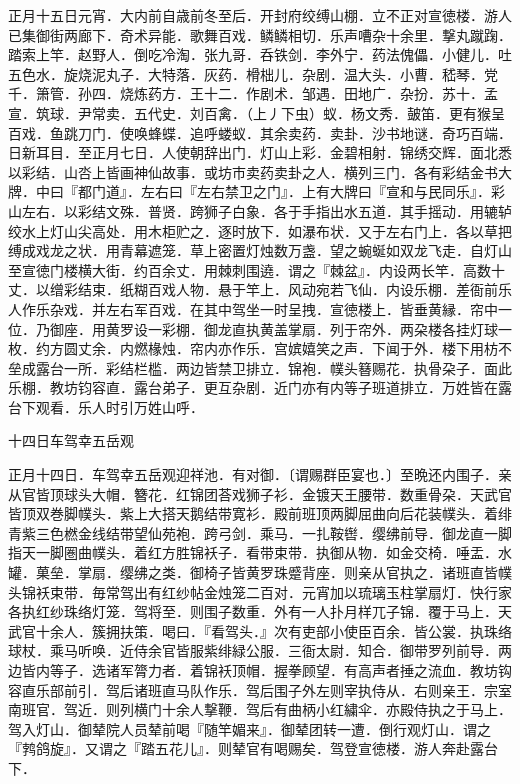 \documentclass[]{article}
\begin{document}
正月十五日元宵．大内前自歳前冬至后．开封府绞缚山棚．立不正对宣徳楼．游人已集御街两廊下．奇术异能．歌舞百戏．鳞鳞相切．乐声嘈杂十余里．撃丸蹴踘．踏索上竿．赵野人．倒吃冷淘．张九哥．呑铁剑．李外宁．药法傀儡．小健儿．吐五色水．旋烧泥丸子．大特落．灰药．榾柮儿．杂剧．温大头．小曹．嵇琴．党千．箫管．孙四．烧炼药方．王十二．作剧术．邹遇．田地广．杂扮．苏十．孟宣．筑球．尹常卖．五代史．刘百禽．（上丿下虫）蚁．杨文秀．皷笛．更有猴呈百戏．鱼跳刀门．使唤蜂蝶．追呼蝼蚁．其余卖药．卖卦．沙书地谜．奇巧百端．日新耳目．至正月七日．人使朝辞出门．灯山上彩．金碧相射．锦绣交辉．面北悉以彩结．山呇上皆画神仙故事．或坊市卖药卖卦之人．横列三门．各有彩结金书大牌．中曰『都门道』．左右曰『左右禁卫之门』．上有大牌曰『宣和与民同乐』．彩山左右．以彩结文殊．普贤．跨狮子白象．各于手指出水五道．其手摇动．用辘轳绞水上灯山尖高处．用木柜贮之．逐时放下．如瀑布状．又于左右门上．各以草把缚成戏龙之状．用青幕遮笼．草上密置灯烛数万盏．望之蜿蜒如双龙飞走．自灯山至宣徳门楼横大街．约百余丈．用棘刺围遶．谓之『棘盆』．内设两长竿．高数十丈．以缯彩结束．纸糊百戏人物．悬于竿上．风动宛若飞仙．内设乐棚．差衙前乐人作乐杂戏．并左右军百戏．在其中驾坐一时呈拽．宣徳楼上．皆垂黄縁．帘中一位．乃御座．用黄罗设一彩棚．御龙直执黄盖掌扇．列于帘外．两朶楼各挂灯球一枚．约方圆丈余．内燃椽烛．帘内亦作乐．宫嫔嬉笑之声．下闻于外．楼下用枋不垒成露台一所．彩结栏槛．两边皆禁卫排立．锦袍．幞头簮赐花．执骨朶子．面此乐棚．教坊钧容直．露台弟子．更互杂剧．近门亦有内等子班道排立．万姓皆在露台下观看．乐人时引万姓山呼．

十四日车驾幸五岳观

正月十四日．车驾幸五岳观迎祥池．有对御．〔谓赐群臣宴也．〕至晩还内围子．亲从官皆顶球头大帽．簪花．红锦团荅戏狮子衫．金镀天王腰带．数重骨朶．天武官皆顶双巻脚幞头．紫上大搭天鹅结带寛衫．殿前班顶两脚屈曲向后花装幞头．着绯青紫三色橪金线结带望仙苑袍．跨弓剑．乘马．一扎鞍辔．缨绋前导．御龙直一脚指天一脚圏曲幞头．着红方胜锦袄子．看带束带．执御从物．如金交椅．唾盂．水罐．菓垒．掌扇．缨绋之类．御椅子皆黄罗珠蹙背座．则亲从官执之．诸班直皆幞头锦袄束带．毎常驾出有红纱帖金烛笼二百对．元宵加以琉璃玉柱掌扇灯．快行家各执红纱珠络灯笼．驾将至．则围子数重．外有一人扑月样兀子锦．覆于马上．天武官十余人．簇拥扶策．喝曰．『看驾头．』次有吏部小使臣百余．皆公裳．执珠络球杖．乘马听唤．近侍余官皆服紫绯緑公服．三衙太尉．知合．御带罗列前导．两边皆内等子．选诸军膂力者．着锦袄顶帽．握拳顾望．有高声者捶之流血．教坊钩容直乐部前引．驾后诸班直马队作乐．驾后围子外左则宰执侍从．右则亲王．宗室南班官．驾近．则列横门十余人撃鞭．驾后有曲柄小红繍伞．亦殿侍执之于马上．驾入灯山．御辇院人员辇前喝『随竿媚来』．御辇团转一遭．倒行观灯山．谓之『鹁鸽旋』．又谓之『踏五花儿』．则辇官有喝赐矣．驾登宣徳楼．游人奔赴露台下．
\end{document}

